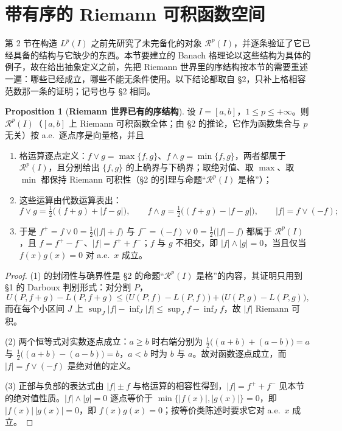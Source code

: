 \documentclass[oneside]{book}
\theoremstyle{definition}
\newcommand{\Rc}{\mathcal{R}}
\theoremstyle{definition}
\newtheorem{proposition}{Proposition}[section]
\begin{document}
	\section{带有序的 Riemann 可积函数空间 }\label{sec:preorder}
	
	第 2 节在构造 $L^{p}(I)$ 之前先研究了未完备化的对象 $\Rc^{p}(I)$，并逐条验证了它已经具备的结构与它缺少的东西。本节要建立的 Banach 格理论以这些结构为具体的例子，故在给出抽象定义之前，先把 Riemann 世界里的序结构按本节的需要重述一遍：哪些已经成立，哪些不能无条件使用。以下结论都取自 \S 2，只补上格相容范数那一条的证明；记号也与 \S 2 相同。
	
	\begin{proposition}[\bfseries{Riemann 世界已有的序结构}]
		设 $I=[a,b]$，$1\leqslant p\leqslant+\infty$。则 $\Rc^{p}(I)$（$[a,b]$ 上 Riemann 可积函数全体；由 \S 2 的推论，它作为函数集合与 $p$ 无关）按 a.e.\ 逐点序是向量格，并且
		\begin{enumerate}[label=(\arabic*),leftmargin=2.2em,itemsep=0.1em,topsep=0.3em]
			\item 格运算逐点定义：$f\vee g=\max\{f,g\}$、$f\wedge g=\min\{f,g\}$，两者都属于 $\Rc^{p}(I)$，且分别给出 $\{f,g\}$ 的上确界与下确界；取绝对值、取 $\max$、取 $\min$ 都保持 Riemann 可积性（\S 2 的引理与命题“$\Rc^{p}(I)$ 是格”）；
			\item 这些运算由代数运算表出：
			\[
			f\vee g=\tfrac12\big((f+g)+|f-g|\big),\qquad
			f\wedge g=\tfrac12\big((f+g)-|f-g|\big),\qquad
			|f|=f\vee(-f);
			\]
			\item 于是 $f^{+}=f\vee0=\tfrac12\big(|f|+f\big)$ 与 $f^{-}=(-f)\vee0=\tfrac12\big(|f|-f\big)$ 都属于 $\Rc^{p}(I)$，且 $f=f^{+}-f^{-}$、$|f|=f^{+}+f^{-}$；$f$ 与 $g$ 不相交，即 $|f|\wedge|g|=0$，当且仅当 $f(x)g(x)=0$ 对 a.e.\ $x$ 成立。
		\end{enumerate}
	\end{proposition}
	
	\begin{proof}
		(1) 的封闭性与确界性是 \S 2 的命题“$\Rc^{p}(I)$ 是格”的内容，其证明只用到 \S 1 的 Darboux 判别形式：对分割 $P$，
		\[
		U(P,f+g)-L(P,f+g)\leqslant\big(U(P,f)-L(P,f)\big)+\big(U(P,g)-L(P,g)\big),
		\]
		而在每个小区间 $J$ 上 $\sup_{J}|f|-\inf_{J}|f|\leqslant\sup_{J}f-\inf_{J}f$，故 $|f|$ Riemann 可积。
		
		(2) 两个恒等式对实数逐点成立：$a\geqslant b$ 时右端分别为 $\tfrac12\big((a+b)+(a-b)\big)=a$ 与 $\tfrac12\big((a+b)-(a-b)\big)=b$，$a<b$ 时为 $b$ 与 $a$。故对函数逐点成立，而 $|f|=f\vee(-f)$ 是绝对值的定义。
		
		(3) 正部与负部的表达式由 $|f|\pm f$ 与格运算的相容性得到，$|f|=f^{+}+f^{-}$ 见本节的绝对值性质。$|f|\wedge|g|=0$ 逐点等价于 $\min\{|f(x)|,|g(x)|\}=0$，即 $|f(x)|\,|g(x)|=0$，即 $f(x)g(x)=0$；按等价类陈述时要求它对 a.e.\ $x$ 成立。
	\end{proof}
	
\end{document}
